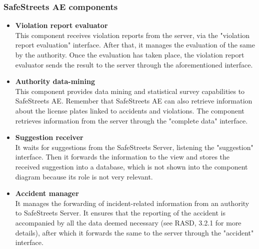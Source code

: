 \documentclass{article}
\begin{document}
		\subsubsection{SafeStreets AE components}
		\begin{itemize}
			\item \textbf{Violation report evaluator}\\
			This component receives violation reports from the server, via the "violation report evaluation" interface. After that, it manages the evaluation of the same by the authority. Once the evaluation has taken place, the violation report evaluator sends the result to the server through the aforementioned interface.
			\item \textbf{Authority data-mining}\\
			This component provides data mining and statistical survey capabilities to SafeStreets AE. Remember that SafeStreets AE can also retrieve information about the license plates linked to accidents and violations. The component retrieves information from the server through the "complete data" interface.
			\item \textbf{Suggestion receiver}\\
			It waits for suggestions from the SafeStreets Server, listening the "suggestion" interface. Then it forwards the information to the view and stores the received suggestion into a database, which is not shown into the component diagram because its role is not very relevant.
			\item \textbf{Accident manager}\\
			It manages the forwarding of incident-related information from an authority to SafeStreets Server. It ensures that the reporting of the accident is accompanied by all the data deemed necessary (see RASD, 3.2.1 for more details), after which it forwards the same to the server through the "accident" interface.
		\end{itemize}
\end{document}
